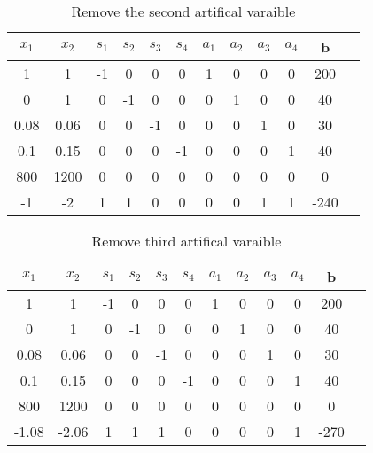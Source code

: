 \documentclass{article}
\begin{document}
  \begin{table}[H]
  \centering
  \caption{Remove the second artifical varaible}
  \begin{tabular}{|c|c|c|c|c|c|c|c|c|c|c|c|}
  \hline
  $x_1$ & $x_2$ & $s_1$  & $s_2$ & $s_3$ & $s_4$ & $a_1$ & $a_2$ & $a_3$ & $a_4$ & b  \\ \hline
  1    & 1    & -1       & 0    & 0    & 0    & 1    & 0    & 0    & 0 & 200 \\ \hline
  0    & 1    & 0        & -1   & 0    & 0    & 0    & 1    & 0    & 0 & 40  \\ \hline
  0.08 & 0.06 & 0        & 0    & -1   & 0    & 0    & 0    & 1    & 0 & 30  \\ \hline
  0.1  & 0.15 & 0        & 0    & 0    & -1   & 0    & 0    & 0    & 1 & 40  \\ \hline
  800  & 1200 & 0        & 0    & 0    & 0    & 0    & 0    & 0    & 0 & 0   \\ \hline
  -1   & -2   & 1        & 1    & 0    & 0    & 0    & 0    & 1    & 1 & -240    \\ \hline
  \end{tabular}
  \end{table}

  \begin{table}[H]
  \centering
  \caption{Remove third artifical varaible}
  \begin{tabular}{|c|c|c|c|c|c|c|c|c|c|c|c|}
  \hline
  $x_1$ & $x_2$ & $s_1$  & $s_2$ & $s_3$ & $s_4$ & $a_1$ & $a_2$ & $a_3$ & $a_4$ & b  \\ \hline
  1    & 1    & -1       & 0    & 0    & 0    & 1    & 0    & 0    & 0 & 200 \\ \hline
  0    & 1    & 0        & -1   & 0    & 0    & 0    & 1    & 0    & 0 & 40  \\ \hline
  0.08 & 0.06 & 0        & 0    & -1   & 0    & 0    & 0    & 1    & 0 & 30  \\ \hline
  0.1  & 0.15 & 0        & 0    & 0    & -1   & 0    & 0    & 0    & 1 & 40  \\ \hline
  800  & 1200 & 0        & 0    & 0    & 0    & 0    & 0    & 0    & 0 & 0   \\ \hline
  -1.08 & -2.06  & 1     & 1    & 1    & 0    & 0    & 0    & 0    & 1 & -270   \\ \hline
  \end{tabular}
  \end{table}
\end{document}
